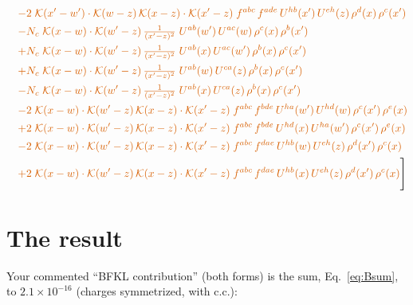 \documentclass[10pt]{article}
\numberwithin{equation}{section}
\begin{document}
\begin{align}
&\quad{\color{BFK}-2\;\mathcal{K}(x'-w')\cdot\mathcal{K}(w-z)\,\mathcal{K}(x-z)\cdot\mathcal{K}(x'-z)\;f^{abc}\,f^{ade}\,U^{hb}(x')\,U^{eh}(z)\,\rho^{d}(x)\,\rho^{c}(x')}\notag\\
&\quad{\color{BFK}-N_c\;\mathcal{K}(x-w)\cdot\mathcal{K}(w'-z)\,\tfrac{1}{(x'-z)^{2}}\;U^{ab}(w')\,U^{ac}(w)\,\rho^{c}(x)\,\rho^{b}(x')}\notag\\
&\quad{\color{BFK}+N_c\;\mathcal{K}(x-w)\cdot\mathcal{K}(w'-z)\,\tfrac{1}{(x'-z)^{2}}\;U^{ab}(x)\,U^{ac}(w')\,\rho^{b}(x)\,\rho^{c}(x')}\notag\\
&\quad{\color{BFK}+N_c\;\mathcal{K}(x-w)\cdot\mathcal{K}(w'-z)\,\tfrac{1}{(x'-z)^{2}}\;U^{ab}(w)\,U^{ca}(z)\,\rho^{b}(x)\,\rho^{c}(x')}\notag\\
&\quad{\color{BFK}-N_c\;\mathcal{K}(x-w)\cdot\mathcal{K}(w'-z)\,\tfrac{1}{(x'-z)^{2}}\;U^{ab}(x)\,U^{ca}(z)\,\rho^{b}(x)\,\rho^{c}(x')}\notag\\
&\quad{\color{BFK}-2\;\mathcal{K}(x-w)\cdot\mathcal{K}(w'-z)\,\mathcal{K}(x-z)\cdot\mathcal{K}(x'-z)\;f^{abc}\,f^{bde}\,U^{ha}(w')\,U^{hd}(w)\,\rho^{c}(x')\,\rho^{e}(x)}\notag\\
&\quad{\color{BFK}+2\;\mathcal{K}(x-w)\cdot\mathcal{K}(w'-z)\,\mathcal{K}(x-z)\cdot\mathcal{K}(x'-z)\;f^{abc}\,f^{bde}\,U^{hd}(x)\,U^{ha}(w')\,\rho^{c}(x')\,\rho^{e}(x)}\notag\\
&\quad{\color{BFK}-2\;\mathcal{K}(x-w)\cdot\mathcal{K}(w'-z)\,\mathcal{K}(x-z)\cdot\mathcal{K}(x'-z)\;f^{abc}\,f^{dae}\,U^{hb}(w)\,U^{eh}(z)\,\rho^{d}(x')\,\rho^{c}(x)}\notag\\
&\quad{\color{BFK}+2\;\mathcal{K}(x-w)\cdot\mathcal{K}(w'-z)\,\mathcal{K}(x-z)\cdot\mathcal{K}(x'-z)\;f^{abc}\,f^{dae}\,U^{hb}(x)\,U^{eh}(z)\,\rho^{d}(x')\,\rho^{c}(x)}\Bigg]\label{eq:Bsum}
\end{align}



\section{The result}\label{sec:final}
Your commented ``BFKL contribution'' (both forms) is the sum, Eq.~\eqref{eq:Bsum}, to $2.1\times10^{-16}$ (charges symmetrized, with c.c.):
\end{document}
